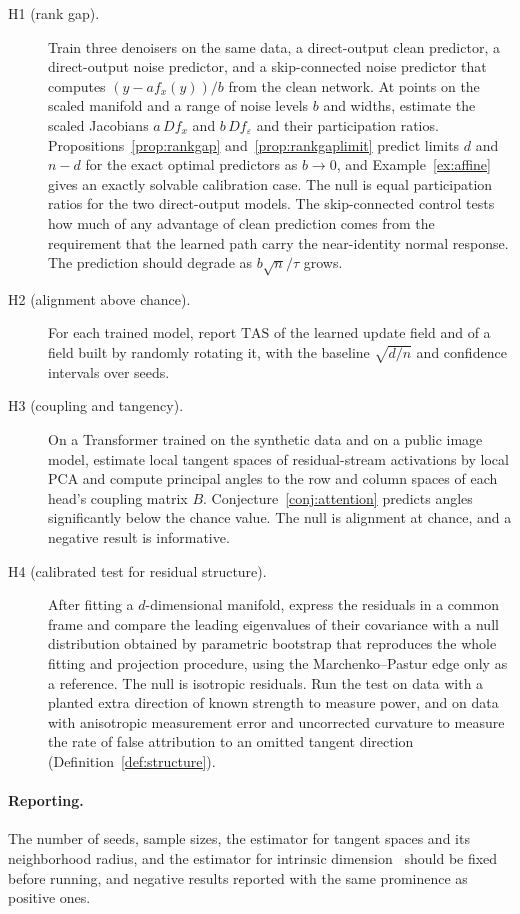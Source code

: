 \documentclass[11pt,a4paper]{article}
\theoremstyle{definition}
\theoremstyle{remark}
\begin{document}
\begin{description}
\item[H1 (rank gap).] Train three denoisers on the same data, a direct-output
clean predictor, a direct-output noise predictor, and a skip-connected noise
predictor that computes $(y-af_x(y))/b$ from the clean network. At points on the
scaled manifold and a range of noise levels $b$ and widths, estimate the scaled
Jacobians $a\,Df_x$ and $b\,Df_\varepsilon$ and their participation ratios.
Propositions~\ref{prop:rankgap} and~\ref{prop:rankgaplimit} predict limits $d$
and $n-d$ for the exact optimal predictors as $b\to0$, and Example~\ref{ex:affine}
gives an exactly solvable calibration case. The null is equal participation
ratios for the two direct-output models. The skip-connected control tests how
much of any advantage of clean prediction comes from the requirement that the
learned path carry the near-identity normal response. The prediction should
degrade as $b\sqrt n/\tau$ grows.
\item[H2 (alignment above chance).] For each trained model, report $\mathrm{TAS}$
of the learned update field and of a field built by randomly rotating it,
with the baseline $\sqrt{d/n}$ and confidence intervals over seeds.
\item[H3 (coupling and tangency).] On a Transformer trained on the synthetic
data and on a public image model, estimate local tangent spaces of
residual-stream activations by local PCA and compute principal angles to the
row and column spaces of each head's coupling matrix $B$.
Conjecture~\ref{conj:attention} predicts angles significantly below the chance
value. The null is alignment at chance, and a negative result is informative.
\item[H4 (calibrated test for residual structure).] After fitting a
$d$-dimensional manifold, express the residuals in a common frame and compare
the leading eigenvalues of their covariance with a null distribution obtained
by parametric bootstrap that reproduces the whole fitting and projection
procedure, using the Marchenko--Pastur edge only as a reference. The null is
isotropic residuals. Run the test on data with a planted extra direction of
known strength to measure power, and on data with anisotropic measurement error
and uncorrected curvature to measure the rate of false attribution to an
omitted tangent direction (Definition~\ref{def:structure}).
\end{description}

\paragraph{Reporting.} The number of seeds, sample sizes, the estimator for
tangent spaces and its neighborhood radius, and the estimator for intrinsic
dimension~\cite{levina2005maximum} should be fixed before running, and
negative results reported with the same prominence as positive ones.
\end{document}
